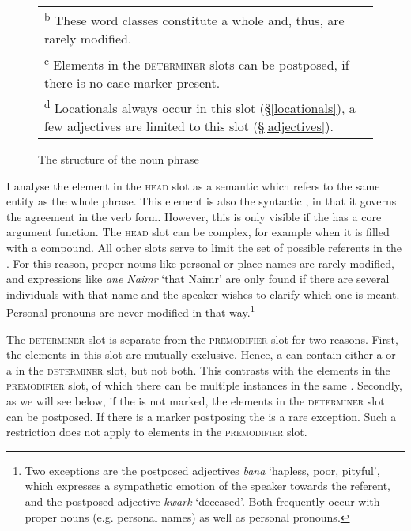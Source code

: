 \begin{figure}
\begin{tabularx}{\textwidth}{|llllll|}
		\multicolumn{6}{l}{\scriptsize{\textsuperscript{b} These word classes constitute a whole \isi{noun phrase} and, thus, are rarely modified.}}\\
		\multicolumn{6}{l}{\scriptsize{\textsuperscript{c} Elements in the \textsc{determiner} slots can be postposed, if there is no case marker present.}}\\
		\multicolumn{6}{l}{\scriptsize{\textsuperscript{d} Locationals always occur in this slot (\S{}\ref{locationals}), a few adjectives are limited to this slot (\S{}\ref{adjectives}).}}\\
	\end{tabularx}
\caption{The structure of the noun phrase}
\label{nounphrasestruc}
\end{figure}

I analyse the element in the \textsc{head} slot as a semantic  which refers to the same entity as the whole phrase. This element is also the syntactic , in that it governs the agreement in the verb form. However, this is only visible if the  has a core argument function. The \textsc{head} slot can be complex, for example when it is filled with a compound. All other slots serve to limit the set of possible referents in the . For this reason, proper nouns like personal or place names are rarely modified, and expressions like \emph{ane Naimr} `that Naimr' are only found if there are several individuals with that name and the speaker wishes to clarify which one is meant. Personal pronouns are never modified in that way.\footnote{Two exceptions are the postposed adjectives \emph{bana} `hapless, poor, pityful', which expresses a sympathetic emotion of the speaker towards the referent, and the postposed adjective \emph{kwark} `deceased'. Both frequently occur with proper nouns (e.g. personal names) as well as personal pronouns.}%

The \textsc{determiner} slot is separate from the \textsc{premodifier} slot for two reasons. First, the elements in this slot are mutually exclusive. Hence, a  can contain either a  or a  in the \textsc{determiner} slot, but not both. This contrasts with the elements in the \textsc{premodifier} slot, of which there can be multiple instances in the same . Secondly, as we will see below, if the  is not  marked, the elements in the \textsc{determiner} slot can be postposed. If there is a  marker postposing the  is a rare exception. Such a restriction does not apply to elements in the \textsc{premodifier} slot.%

